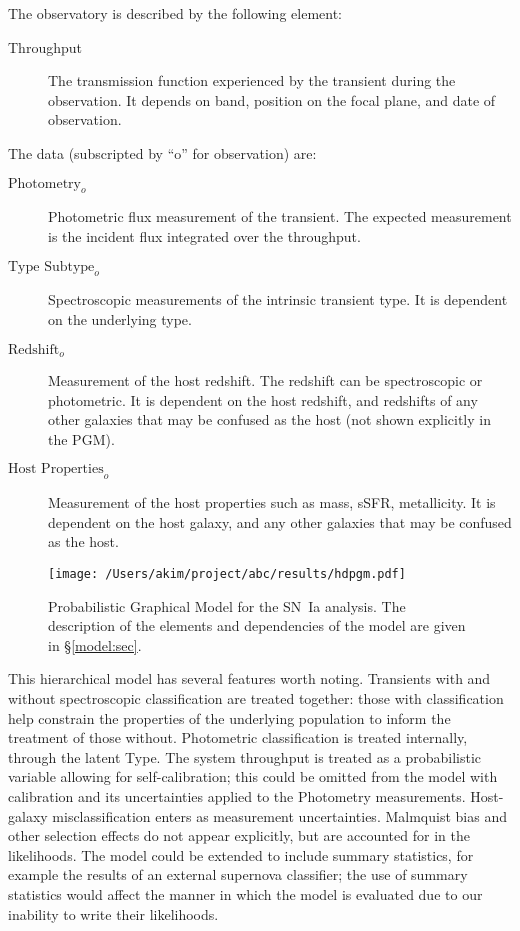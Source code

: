 \documentclass[preprint,3p]{elsarticle}
\begin{document}
The observatory is described by the following element:
\begin{description}
\item[Throughput] The transmission function experienced by the transient during
the observation.  It depends on band, position on the focal plane, and date of observation.
\end{description}
The data (subscripted by ``o'' for observation)  are:
\begin{description}
\item[$\text{Photometry}_o$] Photometric flux measurement of the transient.
The expected measurement
is the incident flux integrated over the throughput.
\item[$\text{Type Subtype}_o$] Spectroscopic
measurements of the intrinsic transient type.  It is dependent on the underlying
type.
\item[$\text{Redshift}_o$] Measurement of the host redshift.  The redshift can be
spectroscopic or photometric.  It is dependent on the host redshift, and
redshifts of any other galaxies that may be confused as the host (not shown explicitly
in the PGM).
\item[$\text{Host Properties}_o$] Measurement of the host properties such
as mass, sSFR, metallicity. It is dependent on the host galaxy, and
any other galaxies that may be confused as the host.
\end{description}


\begin{figure}[htbp] %
   \centering
   \texttt{[image: /Users/akim/project/abc/results/hdpgm.pdf]} 
   \caption{Probabilistic Graphical Model for the SN~Ia analysis.  
   The description of the elements and dependencies of the model are given in
   \S\ref{model:sec}.
   \label{pgm:fig}}
\end{figure}

This hierarchical model has several features worth noting.  Transients with and without
spectroscopic classification are treated together: those with classification help constrain
the properties of the underlying population to inform the treatment of those without.
Photometric classification is treated internally, through the
latent Type.  The system throughput is treated as a probabilistic variable
allowing for self-calibration; this could be omitted from the model with calibration
and its uncertainties applied
to the Photometry measurements.  Host-galaxy misclassification enters as measurement
uncertainties.  Malmquist bias and other selection effects do not appear explicitly, but are accounted
for in the likelihoods.  The model could be extended to include summary statistics,
for example the results of an external supernova classifier; the use
of summary statistics would affect the manner in which the model is evaluated
due to our inability to write their likelihoods.
\end{document}
